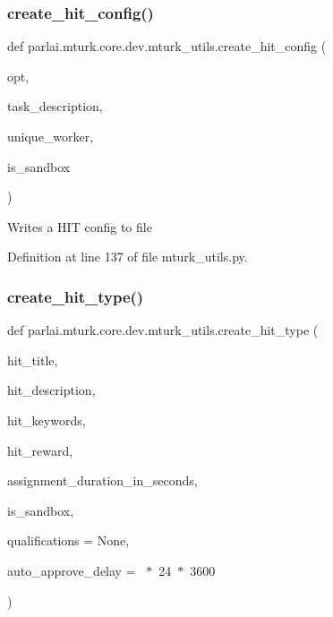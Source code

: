 \subsubsection{\texorpdfstring{create\+\_\+hit\+\_\+config()}{create\_hit\_config()}}
{\footnotesize\ttfamily def parlai.\+mturk.\+core.\+dev.\+mturk\+\_\+utils.\+create\+\_\+hit\+\_\+config (\begin{DoxyParamCaption}\item[{}]{opt,  }\item[{}]{task\+\_\+description,  }\item[{}]{unique\+\_\+worker,  }\item[{}]{is\+\_\+sandbox }\end{DoxyParamCaption})}

\begin{DoxyVerb}Writes a HIT config to file\end{DoxyVerb}
 

Definition at line 137 of file mturk\+\_\+utils.\+py.

\mbox{\label{namespaceparlai_1_1mturk_1_1core_1_1dev_1_1mturk__utils_acd08d4459a8231afa32daccd82c5c957}} 
\subsubsection{\texorpdfstring{create\+\_\+hit\+\_\+type()}{create\_hit\_type()}}
{\footnotesize\ttfamily def parlai.\+mturk.\+core.\+dev.\+mturk\+\_\+utils.\+create\+\_\+hit\+\_\+type (\begin{DoxyParamCaption}\item[{}]{hit\+\_\+title,  }\item[{}]{hit\+\_\+description,  }\item[{}]{hit\+\_\+keywords,  }\item[{}]{hit\+\_\+reward,  }\item[{}]{assignment\+\_\+duration\+\_\+in\+\_\+seconds,  }\item[{}]{is\+\_\+sandbox,  }\item[{}]{qualifications = {\ttfamily None},  }\item[{}]{auto\+\_\+approve\+\_\+delay = {~$\ast$~24~$\ast$~3600} }\end{DoxyParamCaption})}

